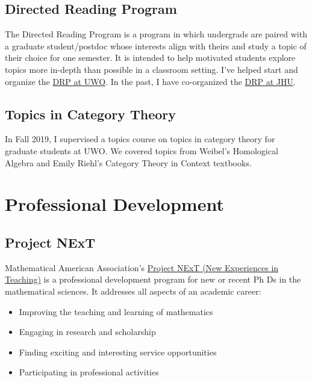 \documentclass[
]{report}
\providecommand{\tightlist}{%
  \setlength{\itemsep}{0pt}\setlength{\parskip}{0pt}}
\begin{document}
\hypertarget{directed-reading-program}{%
\section{Directed Reading Program}\label{directed-reading-program}}

The Directed Reading Program is a program in which undergrads are paired with a graduate student/postdoc whose interests align with theirs and study a topic of their choice for one semester. It is intended to help motivated students explore topics more in-depth than possible in a classroom setting. I've helped start and organize the \href{https://www.math.uwo.ca/undergraduate/current_students/directed_reading_program.html}{DRP at UWO}. In the past, I have co-organized the \href{https://math.jhu.edu/drp.html}{DRP at JHU}.

\hypertarget{topics-in-category-theory}{%
\section{Topics in Category Theory}\label{topics-in-category-theory}}

In Fall 2019, I supervised a topics course on topics in category theory for graduate students at UWO.
We covered topics from Weibel's Homological Algebra and Emily Riehl's Category Theory in Context textbooks.

\hypertarget{professional-development-1}{%
\chapter{Professional Development}\label{professional-development-1}}

\hypertarget{project-next}{%
\section{Project NExT}\label{project-next}}

Mathematical American Association's \href{https://www.maa.org/programs-and-communities/professional-development/project-next}{Project NExT (New Experiences in Teaching)} is a professional development program for new or recent Ph Ds in the mathematical sciences. It addresses all aspects of an academic career:

\begin{itemize}
\tightlist
\item
  Improving the teaching and learning of mathematics
\item
  Engaging in research and scholarship
\item
  Finding exciting and interesting service opportunities
\item
  Participating in professional activities
\end{itemize}
\end{document}
